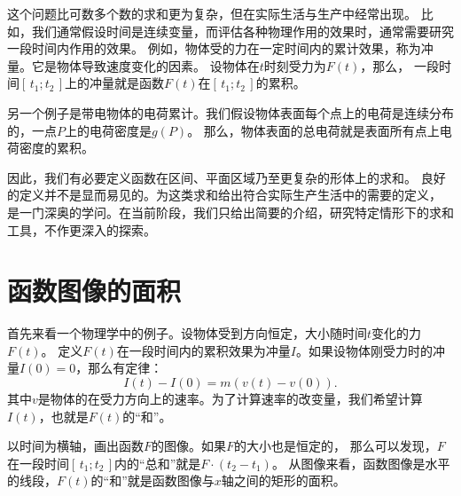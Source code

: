 \documentclass[12pt,UTF8,fontset=none]{ctexbook}
\begin{document}
这个问题比可数多个数的求和更为复杂，但在实际生活与生产中经常出现。
比如，我们通常假设时间是连续变量，而评估各种物理作用的效果时，通常需要研究一段时间内作用的效果。
例如，物体受的力在一定时间内的累计效果，称为冲量。它是物体导致速度变化的因素。
设物体在$t$时刻受力为$F(t)$，那么，
一段时间$[\,t_1; t_2\,]$上的冲量就是函数$F(t)$在$[\,t_1; t_2\,]$的累积。

另一个例子是带电物体的电荷累计。我们假设物体表面每个点上的电荷是连续分布的，一点$P$上的电荷密度是$g(P)$。
那么，物体表面的总电荷就是表面所有点上电荷密度的累积。

因此，我们有必要定义函数在区间、平面区域乃至更复杂的形体上的求和。
良好的定义并不是显而易见的。为这类求和给出符合实际生产生活中的需要的定义，
是一门深奥的学问。在当前阶段，我们只给出简要的介绍，研究特定情形下的求和工具，不作更深入的探索。

\section{函数图像的面积}

首先来看一个物理学中的例子。设物体受到方向恒定，大小随时间$t$变化的力$F(t)$。
定义$F(t)$在一段时间内的累积效果为冲量$I$。如果设物体刚受力时的冲量$I(0) = 0$，那么有定律：
$$ I(t) - I(0) = m(v(t) - v(0)).$$
其中$v$是物体的在受力方向上的速率。为了计算速率的改变量，我们希望计算$I(t)$，也就是$F(t)$的“和”。

以时间为横轴，画出函数$F$的图像。如果$F$的大小也是恒定的，
那么可以发现，$F$在一段时间$[\,t_1; t_2\,]$内的“总和”就是$F \cdot (t_2 - t_1)$。
从图像来看，函数图像是水平的线段，$F(t)$的“和”就是函数图像与$x$轴之间的矩形的面积。
\end{document}
